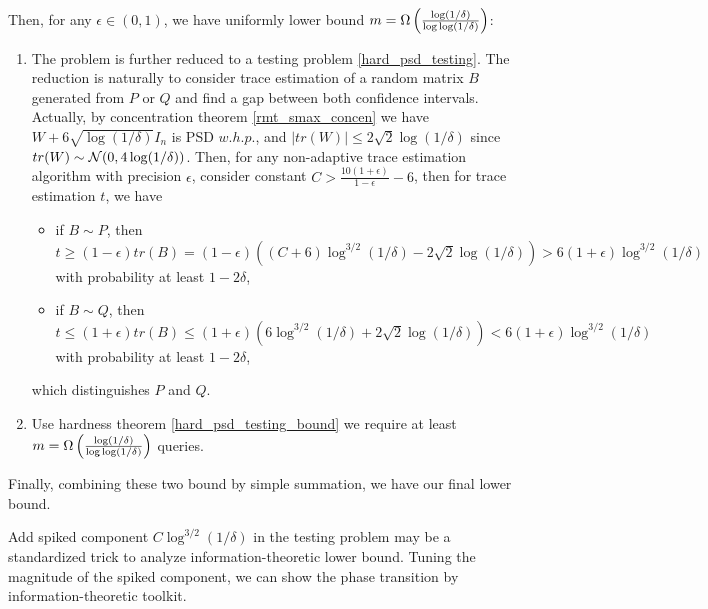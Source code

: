 {\noindent Then, for any $\epsilon\in(0,1)$, we have uniformly lower bound $m=\Omega\left(\frac{\log(1/\delta)}{\log\log(1/\delta)}\right)$:
\begin{enumerate}
    \item The problem is further reduced to a testing problem \ref{hard_psd_testing}.
    The reduction is naturally to consider trace estimation of a random matrix $B$ generated from $P$ or $Q$ and find a gap between both confidence intervals. Actually, by concentration theorem \ref{rmt_smax_concen} we have $W + 6\sqrt{\log(1/\delta)}I_n$ is PSD $w.h.p.$, and $|tr(W)|\le 2\sqrt{2}\log(1/\delta)$ since $tr(W)\sim\mathcal{N}(0,4\log(1/\delta))$. Then, for any non-adaptive trace estimation algorithm with precision $\epsilon$, consider constant $C>\frac{10(1+\epsilon)}{1-\epsilon}-6$, then for trace estimation $t$, we have
    \begin{itemize}
        \item if $B\sim P$, then $t\ge(1-\epsilon)tr(B)=(1-\epsilon)((C+6)\log^{3/2}(1/\delta)-2\sqrt{2}\log(1/\delta))>6(1+\epsilon)\log^{3/2}(1/\delta)$ with probability at least $1-2\delta$,
        \item if $B\sim Q$, then $t\le(1+\epsilon)tr(B)\le(1+\epsilon)(6\log^{3/2}(1/\delta)+2\sqrt{2}\log(1/\delta))<6(1+\epsilon)\log^{3/2}(1/\delta)$ with probability at least $1-2\delta$,
    \end{itemize}
    which distinguishes $P$ and $Q$.
    
    \item Use hardness theorem \ref{hard_psd_testing_bound} we require at least $m=\Omega\left(\frac{\log(1/\delta)}{\log\log(1/\delta)}\right)$ queries. 
\end{enumerate}

\noindent Finally, combining these two bound by simple summation, we have our final lower bound.
}


\begin{rmk}
    Add spiked component $C\log^{3/2}(1/\delta)$ in the testing problem may be a standardized trick to analyze information-theoretic lower bound. Tuning the magnitude of the spiked component, we can show the phase transition by information-theoretic toolkit.
\end{rmk}

